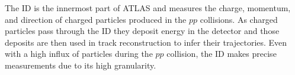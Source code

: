 



The ID is the innermost part of ATLAS and measures the charge, momentum, and direction of charged particles produced in the $pp$ collisions. As charged particles pass through the ID they deposit energy in the detector and those deposits are then used in track reconstruction to infer their trajectories. Even with a high influx of particles during the $pp$ collision, the ID makes precise measurements due to its high granularity.

